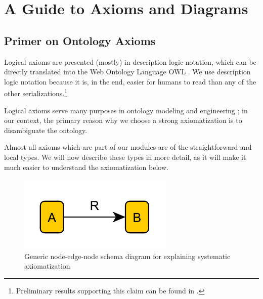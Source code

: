 \chapter{A Guide to Axioms and Diagrams}\label{chap:guide}

\section*{Primer on Ontology Axioms}

Logical axioms are presented (mostly) in description logic notation, which can be directly translated into the Web Ontology Language OWL \cite{FOST}. We use description logic notation because it is, in the end, easier for humans to read than any of the other serializations.\footnote{Preliminary results supporting this claim can be found in \cite{ShimizuMS}.} 

Logical axioms serve many purposes in ontology modeling and engineering \cite{HitzlerK16};  in our context, the primary reason why we choose a strong axiomatization is to disambiguate the ontology.

Almost all axioms which are part of our modules are of the straightforward and local types. We will now describe these types in more detail, as it will make it much easier to understand the axiomatization below.

\bigskip

\begin{figure}[thb]
\begin{center}
\includegraphics[width=.3\textwidth]{diagrams/02-ARB}
\caption{Generic node-edge-node schema diagram for explaining systematic axiomatization}\label{fig:rec-ARB}
\end{center}
\end{figure}

